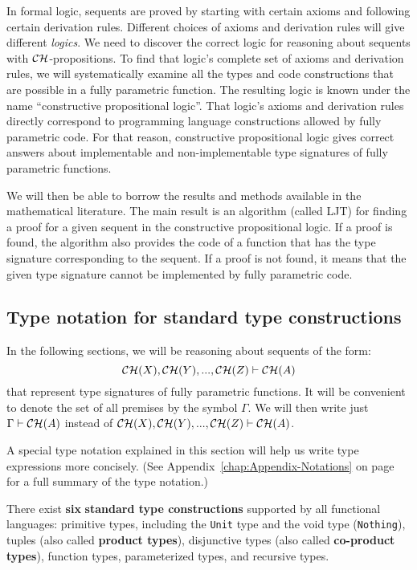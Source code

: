 In formal logic, sequents are proved by starting
with certain axioms and following certain derivation rules. Different
choices of axioms and derivation rules will give different \emph{logics}.
We need to discover the correct logic for reasoning about sequents
with ${\cal CH}$-propositions. To find that logic\textsf{'}s complete set
of axioms and derivation rules, we will systematically examine all
the types and code constructions that are possible in a fully parametric
function. The resulting logic is known under the name \textsf{``}constructive
propositional logic\textsf{''}. That logic\textsf{'}s axioms and derivation rules directly
correspond to programming language constructions allowed by fully
parametric code. For that reason, constructive propositional logic
gives correct answers about implementable and non-implementable type
signatures of fully parametric functions.

We will then be able to borrow the results and methods available in
the mathematical literature. The main result is an algorithm (called
LJT) for finding a proof for a given sequent in the constructive propositional
logic. If a proof is found, the algorithm also provides the code of
a function that has the type signature corresponding to the sequent.
If a proof is not found, it means that the given type signature cannot
be implemented by fully parametric code.

\subsection{Type notation for standard type constructions\label{subsec:Type-notation-and-standard-type-constructions}}

In the following sections, we will be reasoning about sequents of
the form:
\[
{\cal CH}(X),{\cal CH}(Y),...,{\cal CH}(Z)\vdash{\cal CH}(A)
\]
that represent type signatures of fully parametric functions. It will
be convenient to denote the set of all premises by the symbol $\Gamma$.
We will then write just $\Gamma\vdash{\cal CH}(A)$ instead of ${\cal CH}(X),{\cal CH}(Y),...,{\cal CH}(Z)\vdash{\cal CH}(A)$.

A special type notation explained in this section
will help us write type expressions more concisely. (See Appendix~\ref{chap:Appendix-Notations}
on page~\pageref{chap:Appendix-Notations} for a full summary of
the type notation.)

There exist \textbf{six} \textbf{standard type constructions}
supported by all functional languages: primitive types, including
the \lstinline!Unit! type and the void type (\lstinline!Nothing!),
tuples (also called \textbf{product types}),
disjunctive types (also called \textbf{co-product
types}), function types, parameterized types, and recursive types. 

